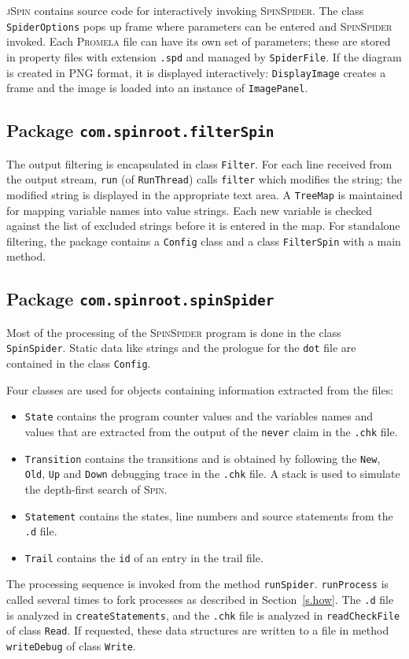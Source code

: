\documentclass[11pt]{article}
\newcommand{\spn}{\textsc{Spin}}
\newcommand{\prm}{\textsc{Promela}}
\newcommand{\js}{\textsc{jSpin}}
\newcommand{\spd}{\textsc{SpinSpider}}
\newcommand{\dtf}{\texttt{dot}}
\newcommand{\p}[1]{\texttt{#1}}
\newcommand{\bu}[1]{\textsf{#1}}
\begin{document}
\js{} contains source code for interactively invoking \spd{}.
The class \p{SpiderOptions} pops up frame where parameters can be entered and
\spd{} invoked. Each \prm{} file can have its own set of parameters; these are stored
in property files with extension \p{.spd} and managed by \p{SpiderFile}. 
If the diagram is created in \bu{PNG} format, it is displayed interactively:
\p{DisplayImage} creates a frame and 
the image is loaded into an instance of \p{ImagePanel}.

\subsection{Package \p{com.spinroot.filterSpin}}

The output filtering is encapsulated in class \p{Filter}.
For each line received from the output stream, \p{run}
(of \p{RunThread}) calls \p{filter}
which modifies the string; the modified string is displayed in the
appropriate text area.
A \p{TreeMap} is maintained for mapping variable names into value strings.
Each new variable is checked against the list of excluded strings before
it is entered in the map.
For standalone filtering, the package 
contains a \p{Config} class and a class \p{FilterSpin} with a main method.

\subsection{Package \p{com.spinroot.spinSpider}}

Most of the processing of the \spd{} program is done 
in the class \p{SpinSpider}. 
Static data like strings and the prologue for the \dtf{} file are
contained in the class \p{Config}. 

Four classes are used for
objects containing information extracted from the files:
\begin{itemize}
\item \p{State} contains the program counter values and the variables names
and values that are extracted from the output of the \p{never} claim in the
\p{.chk} file.
\item \p{Transition} contains the transitions and is obtained by following
the \p{New}, \p{Old}, \p{Up} and \p{Down} debugging trace in the \p{.chk} file.
A stack is used to simulate the depth-first search of \spn{}.
\item \p{Statement} contains the states, line numbers and source statements
from the \p{.d} file.
\item \p{Trail} contains the \p{id} of an entry in the trail file.
\end{itemize}
The processing sequence is invoked from the method \p{runSpider}. 
\p{runProcess} is called several times to fork processes as described in
Section~\ref{s.how}. The \p{.d} file is analyzed in \p{createStatements},
and the \p{.chk} file is analyzed in \p{readCheckFile} of class \p{Read}.
If requested, these data structures are written to a file in method 
\p{writeDebug} of class \p{Write}.
\end{document}
